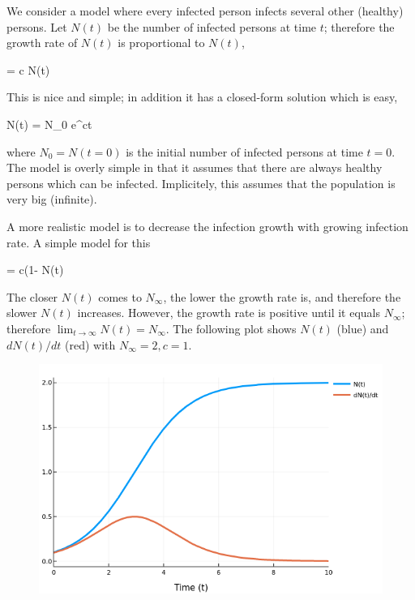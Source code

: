
We consider a model where every infected person infects several other (healthy) persons. Let $N(t)$ be the number of infected persons at time $t$; therefore the growth rate of $N(t)$ is proportional to $N(t)$,

\bee
{} = c N(t)
\eee

This is nice and simple; in addition it has a closed-form solution which is easy,

\bee
N(t) = N_0 e^{ct}
\eee

where $N_0 = N(t=0)$ is the initial number of infected persons at time $t=0$. The model is overly simple in that it assumes that there are always healthy persons which can be infected. Implicitely, this assumes that the population is very big (infinite).

A more realistic model is to decrease the infection growth with growing infection rate. A simple model for this

\bee
{} = c(1- N(t)
\eee

The closer $N(t)$ comes to $N_\infty$, the lower the growth rate is, and therefore the slower $N(t)$ increases. However, the growth rate is positive until it equals $N_\infty$; therefore $\lim_{t \rightarrow \infty} N(t) = N_\infty$. The following plot shows $N(t)$ (blue) and $dN(t)/dt$ (red) with $N_\infty = 2, c = 1$.

\begin{figure}[H]
\centering
\includegraphics[scale=0.55]{images/virus_1.png}
\end{figure}




